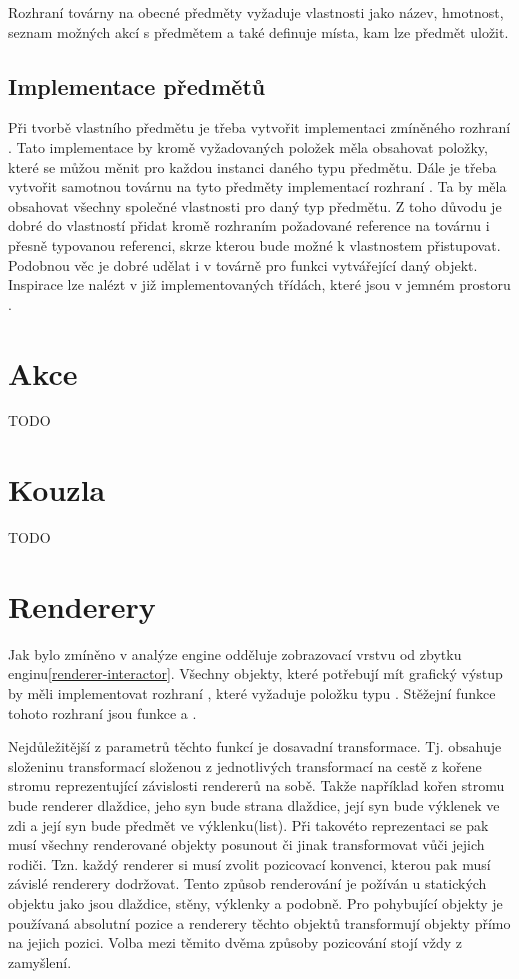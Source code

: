 Rozhraní továrny na obecné předměty vyžaduje vlastnosti jako název, hmotnost, seznam 
možných akcí s předmětem a také definuje místa, kam lze předmět uložit.

\subsection{Implementace předmětů}
Při tvorbě vlastního předmětu je třeba vytvořit implementaci zmíněného rozhraní . Tato implementace by 
kromě vyžadovaných položek měla obsahovat položky, které se můžou měnit pro každou instanci daného typu předmětu. 
Dále je třeba vytvořit samotnou továrnu na tyto předměty implementací rozhraní .
Ta by měla obsahovat všechny společné vlastnosti pro daný typ předmětu. Z toho  důvodu je dobré do vlastností 
přidat kromě rozhraním požadované reference na továrnu i přesně typovanou referenci, skrze kterou bude možné k 
vlastnostem přistupovat. Podobnou věc je dobré udělat i v továrně pro funkci vytvářející daný objekt. Inspirace
lze nalézt v již implementovaných třídách, které jsou v jemném prostoru .

\section{Akce}
TODO
\section{Kouzla}
TODO

\section{Renderery}
Jak bylo zmíněno v analýze engine odděluje zobrazovací vrstvu od zbytku enginu\vref{renderer-interactor}. Všechny objekty,
které potřebují mít grafický výstup by měli implementovat rozhraní , které vyžaduje položku typu . 
Stěžejní funkce tohoto rozhraní jsou funkce  a . 

Nejdůležitější z parametrů těchto funkcí je dosavadní transformace. Tj. obsahuje složeninu transformací složenou z jednotlivých
transformací na cestě z kořene stromu reprezentující závislosti rendererů na sobě. Takže například kořen stromu bude renderer
dlaždice, jeho syn bude strana dlaždice, její syn bude výklenek ve zdi a její syn bude předmět ve
výklenku(list). Při takovéto reprezentaci se pak musí všechny renderované objekty posunout či jinak transformovat vůči jejich rodiči.
Tzn. každý renderer si musí zvolit pozicovací konvenci, kterou pak musí závislé renderery dodržovat. Tento způsob renderování je požíván u statických objektu jako
jsou dlaždice, stěny, výklenky a podobně. Pro pohybující objekty je používaná absolutní pozice a renderery
těchto objektů transformují objekty přímo na jejich pozici. Volba mezi těmito dvěma způsoby pozicování stojí vždy z zamyšlení.

